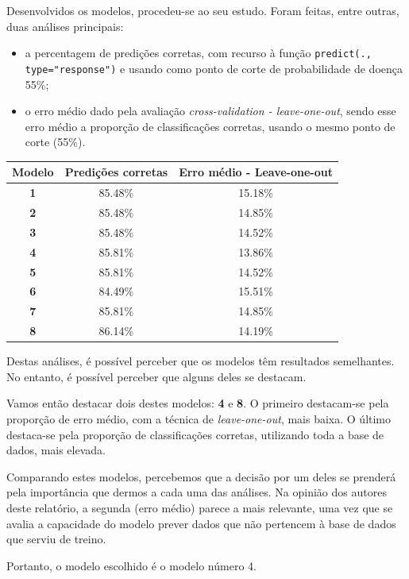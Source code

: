 \documentclass[a4paper]{report}
\begin{document}
{	Desenvolvidos os modelos, procedeu-se ao seu estudo. Foram feitas, entre outras, duas análises principais:
	\begin{itemize}
		\item a percentagem de predições corretas, com recurso à função \verb|predict(., type="response")| e usando como ponto de corte de probabilidade de doença 55\%;
		\item o erro médio dado pela avaliação \textit{cross-validation - leave-one-out}, sendo esse erro médio a proporção de classificações corretas, usando o mesmo ponto de corte (55\%).
	\end{itemize}
	\begin{center}
		\begin{tabular}{ | c | c | c | }
		\hline
		\textbf{Modelo} & \textbf{Predições corretas} & \textbf{Erro médio - Leave-one-out} \\ 
		\hline
		\textbf{1} & 85.48\% & 15.18\% \\ 
		\hline
		\textbf{2} & 85.48\% & 14.85\% \\
		\hline
		\textbf{3} & 85.48\% & 14.52\% \\
		\hline
		\textbf{4} & 85.81\% & 13.86\% \\
		\hline
		\textbf{5} & 85.81\% & 14.52\% \\
		\hline
		\textbf{6} & 84.49\% & 15.51\% \\
		\hline
		\textbf{7} & 85.81\% & 14.85\% \\
		\hline								   	
		\textbf{8} & 86.14\% & 14.19\% \\
		\hline
		\end{tabular}
	\end{center}

	Destas análises, é possível perceber que os modelos têm resultados semelhantes. No entanto, é possível perceber que alguns deles se destacam.

	Vamos então destacar dois destes modelos: \textbf{4} e \textbf{8}. O primeiro destacam-se pela proporção de erro médio, com a técnica de \textit{leave-one-out}, mais baixa.
	O último destaca-se pela proporção de classificações corretas, utilizando toda a base de dados, mais elevada.

	Comparando estes modelos, percebemos que a decisão por um deles se prenderá pela importância que dermos a cada uma das análises.
	Na opinião dos autores deste relatório, a segunda (erro médio) parece a mais relevante, uma vez que se avalia a capacidade do modelo prever dados que não pertencem à base de dados que serviu de treino.

	Portanto, o modelo escolhido é o modelo número 4.
}
\end{document}
